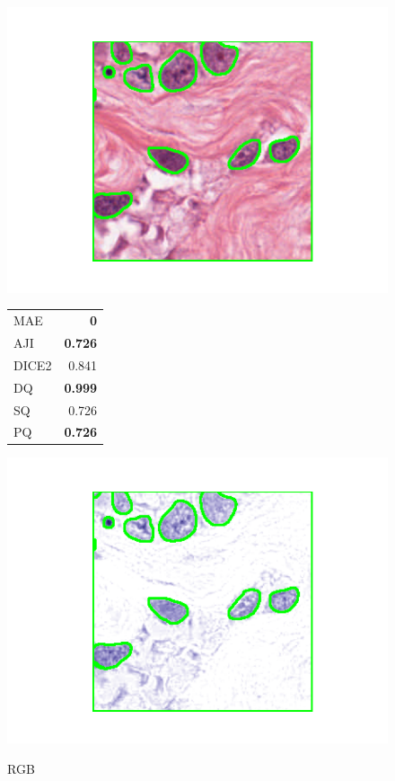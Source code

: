 \documentclass[target=bach,aauheader=,style=]{thud}
\begin{document}
\begin{figure}[ht]
\centering

\begin{minipage}{0.48\textwidth}\centering
  \includegraphics[width=\linewidth]{imgs/qualitative/best/RGB/contour_img.png}\\[-1ex]
  \footnotesize
  \begin{tabular}{@{}lr@{}}
   MAE & \textbf{0}\\ AJI & \textbf{0.726}\\ DICE2 & 0.841\\
   DQ & \textbf{0.999}\\ SQ & 0.726\\ PQ & \textbf{0.726}
  \end{tabular}
  \caption*{RGB}
\end{minipage}\hfill
\begin{minipage}{0.48\textwidth}\centering
  \includegraphics[width=\linewidth]{imgs/qualitative/best/HE/contour_img.png}\\[-1ex]

\end{minipage}
\end{figure}
\end{document}
